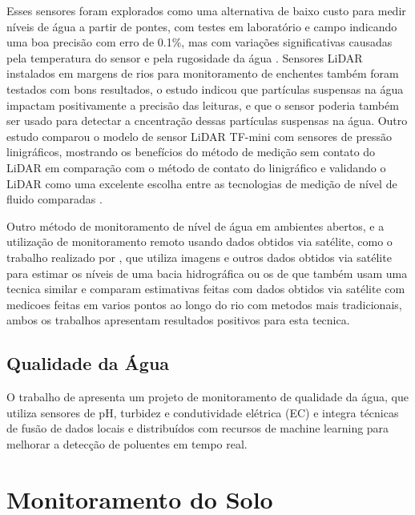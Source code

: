 \documentclass[conference]{IEEEtran}
\begin{document}
Esses sensores foram explorados como uma alternativa de baixo custo para medir níveis de água a partir de pontes, com testes em laboratório e campo indicando uma boa precisão com erro de 0.1\%, mas com variações significativas causadas pela temperatura do sensor e pela rugosidade da água \cite{paul_2020_a}. Sensores LiDAR instalados em margens de rios para monitoramento de enchentes também foram testados com bons resultados, o estudo indicou que partículas suspensas na água impactam positivamente a precisão das leituras, e que o sensor poderia também ser usado para detectar a cncentração dessas partículas suspensas na água\cite{tamari_2016_flash}. Outro estudo comparou o modelo de sensor LiDAR TF-mini com sensores de pressão linigráficos, mostrando os benefícios do método de medição sem contato do LiDAR em comparação com o método de contato do linigráfico e validando o LiDAR como uma excelente escolha entre as tecnologias de medição de nível de fluido comparadas \cite{santana_2024_development}.

Outro método de monitoramento de nível de água em ambientes abertos, e a utilização de monitoramento remoto usando dados obtidos via satélite, como o trabalho realizado por \textcite{jiang_2024_monitoring}, que utiliza imagens e outros dados obtidos via satélite para estimar os níveis de uma bacia hidrográfica ou os de \textcite{ali_2024_satellite} que também usam uma tecnica similar e comparam  estimativas feitas com dados obtidos via satélite com medicoes feitas em varios pontos ao longo do rio com metodos mais tradicionais, ambos os trabalhos apresentam resultados positivos para esta tecnica.

\subsection{Qualidade da Água}
O trabalho de \textcite{ferreira_2023_conception} apresenta um projeto de monitoramento de qualidade da água, que utiliza sensores de pH, turbidez e condutividade elétrica (EC) e integra técnicas de fusão de dados locais e distribuídos com recursos de machine learning para melhorar a detecção de poluentes em tempo real. 

\section{Monitoramento do Solo}
\end{document}
